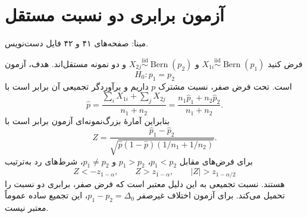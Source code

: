 \documentclass[12pt,a4paper,oneside]{report}
\newcommand{\source}[1]{\par{\small\color{muted} مبنا: صفحه‌های #1 فایل دست‌نویس.}\par}
\newcommand{\iid}{\overset{\mathrm{iid}}{\sim}}
\begin{document}
\section{آزمون برابری دو نسبت مستقل}
\source{۴۱ و ۴۲}
فرض کنید $X_{1i}\iid\operatorname{Bern}(p_1)$ و $X_{2j}\iid\operatorname{Bern}(p_2)$ و دو نمونه مستقل‌اند. هدف، آزمون
\[H_0:p_1=p_2\]
است. تحت فرض صفر، نسبت مشترک $p$ داریم و برآوردگر تجمیعی آن برابر است با
\[
\widehat p=\frac{\sum_iX_{1i}+\sum_jX_{2j}}{n_1+n_2}
=\frac{n_1\widehat p_1+n_2\widehat p_2}{n_1+n_2}.
\]
بنابراین آمارهٔ بزرگ‌نمونه‌ای آزمون برابر است با
\[
\boxed{Z=\frac{\widehat p_1-\widehat p_2}
{\sqrt{\widehat p(1-\widehat p)(1/n_1+1/n_2)}}.}
\]
برای فرض‌های مقابل $p_1<p_2$، $p_1>p_2$ و $p_1\ne p_2$، شرط‌های رد به‌ترتیب
\[
Z<-z_{1-\alpha},\qquad Z>z_{1-\alpha},\qquad |Z|>z_{1-\alpha/2}
\]
هستند. نسبت تجمیعی به این دلیل معتبر است که فرض صفر، برابری دو نسبت را تحمیل می‌کند. برای آزمون اختلاف غیرصفر $p_1-p_2=\Delta_0$، این تجمیع ساده عموماً معتبر نیست.
\end{document}
